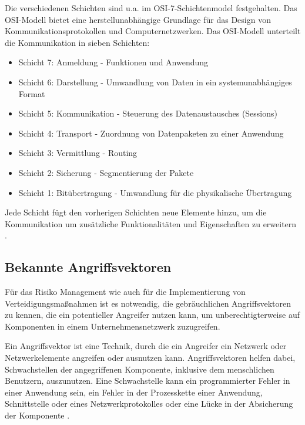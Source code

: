 Die verschiedenen Schichten sind u.a. im OSI-7-Schichtenmodel festgehalten.
Das OSI-Modell bietet eine herstellunabhängige Grundlage für das Design von Kommunikationsprotokollen und Computernetzwerken. Das OSI-Modell unterteilt die Kommunikation in sieben Schichten:
\begin{itemize}
\item Schicht 7: Anmeldung - Funktionen und Anwendung
\item Schicht 6: Darstellung - Umwandlung von Daten in ein systemunabhängiges Format
\item Schicht 5: Kommunikation - Steuerung des Datenaustausches (Sessions)
\item Schicht 4: Transport - Zuordnung von Datenpaketen zu einer Anwendung
\item Schicht 3: Vermittlung - Routing
\item Schicht 2: Sicherung - Segmentierung der Pakete 
\item Schicht 1: Bitübertragung - Umwandlung für die physikalische Übertragung
\end{itemize}

Jede Schicht fügt den vorherigen Schichten neue Elemente hinzu, um die Kommunikation um zusätzliche Funktionalitäten und Eigenschaften zu erweitern \citep{OSI1}. 



\subsection{Bekannte Angriffsvektoren}
Für das Risiko Management wie auch für die Implementierung von Verteidigungsmaßnahmen ist es notwendig, die gebräuchlichen Angriffsvektoren zu kennen, die ein potentieller Angreifer nutzen kann, um unberechtigterweise auf Komponenten in einem Unternehmensnetzwerk zuzugreifen. 

Ein Angriffsvektor ist eine Technik, durch die ein Angreifer ein Netzwerk oder Netzwerkelemente angreifen oder ausnutzen kann. Angriffsvektoren helfen dabei, Schwachstellen der angegriffenen Komponente, inklusive dem menschlichen Benutzern, auszunutzen. Eine Schwachstelle kann ein programmierter Fehler in einer Anwendung sein, ein Fehler in der Prozesskette einer Anwendung, Schnittstelle oder eines Netzwerkprotokolles oder eine Lücke in der Absicherung der Komponente \citep{AttackVector1}. 

